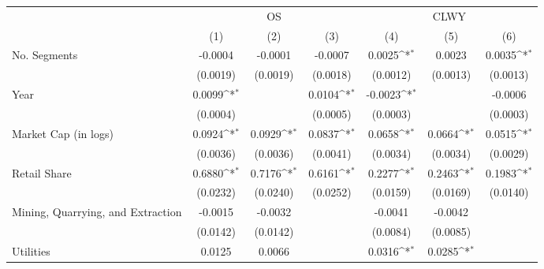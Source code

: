 {
\def\sym#1{\ifmmode^{#1}\else\(^{#1}\)\fi}
\begin{tabular}{l*{6}{c}}
\hline\hline
                    &\multicolumn{3}{c}{OS}                                     &\multicolumn{3}{c}{CLWY}                                   \\\cmidrule(lr){2-4}\cmidrule(lr){5-7}
                    &\multicolumn{1}{c}{(1)}       &\multicolumn{1}{c}{(2)}       &\multicolumn{1}{c}{(3)}       &\multicolumn{1}{c}{(4)}       &\multicolumn{1}{c}{(5)}       &\multicolumn{1}{c}{(6)}       \\
\hline
No. Segments        &     -0.0004       &     -0.0001       &     -0.0007       &      0.0025\sym{*}&      0.0023       &      0.0035\sym{*}\\
                    &    (0.0019)       &    (0.0019)       &    (0.0018)       &    (0.0012)       &    (0.0013)       &    (0.0013)       \\
Year                &      0.0099\sym{*}&                   &      0.0104\sym{*}&     -0.0023\sym{*}&                   &     -0.0006       \\
                    &    (0.0004)       &                   &    (0.0005)       &    (0.0003)       &                   &    (0.0003)       \\
Market Cap (in logs)&      0.0924\sym{*}&      0.0929\sym{*}&      0.0837\sym{*}&      0.0658\sym{*}&      0.0664\sym{*}&      0.0515\sym{*}\\
                    &    (0.0036)       &    (0.0036)       &    (0.0041)       &    (0.0034)       &    (0.0034)       &    (0.0029)       \\
Retail Share        &      0.6880\sym{*}&      0.7176\sym{*}&      0.6161\sym{*}&      0.2277\sym{*}&      0.2463\sym{*}&      0.1983\sym{*}\\
                    &    (0.0232)       &    (0.0240)       &    (0.0252)       &    (0.0159)       &    (0.0169)       &    (0.0140)       \\
Mining, Quarrying, and Extraction&     -0.0015       &     -0.0032       &                   &     -0.0041       &     -0.0042       &                   \\
                    &    (0.0142)       &    (0.0142)       &                   &    (0.0084)       &    (0.0085)       &                   \\
Utilities           &      0.0125       &      0.0066       &                   &      0.0316\sym{*}&      0.0285\sym{*}&                   \\

\end{tabular}}
